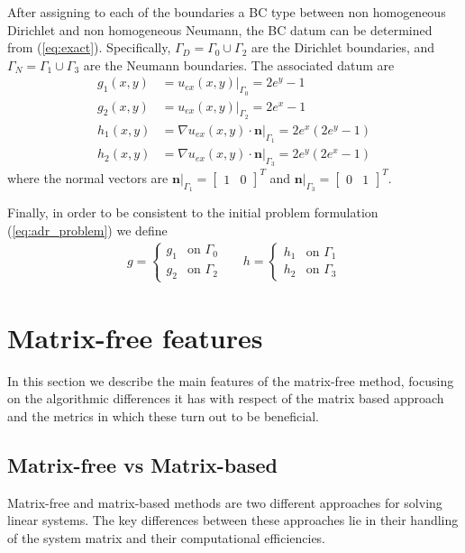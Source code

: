 \documentclass{article}
\begin{document}
After assigning to each of the boundaries a BC type between non homogeneous Dirichlet and non homogeneous Neumann, the BC datum can be determined from (\ref{eq:exact}). Specifically, $\Gamma_D = \Gamma_0 \cup \Gamma_2$ are the Dirichlet boundaries, and
 $\Gamma_N = \Gamma_1 \cup \Gamma_3$ are the Neumann boundaries. The associated datum are
\begin{align*}
    g_1(x,y)&= u_{ex}(x,y)\big|_{\Gamma_0} = 2e^y-1 \\
    g_2(x,y)&= u_{ex}(x,y)\big|_{\Gamma_2} = 2e^x-1 \\
    h_1(x,y)&= \nabla u_{ex}(x,y) \cdot \boldsymbol{n} \big|_{\Gamma_1} = 2e^x(2e^y-1) \\
    h_2(x,y)&= \nabla u_{ex}(x,y) \cdot \boldsymbol{n} \big|_{\Gamma_3} = 2e^y(2e^x-1)
\end{align*}
where the normal vectors are $ \boldsymbol{n}\big|_{\Gamma_1} = \begin{bmatrix}1&0\end{bmatrix}^T$ and $\boldsymbol{n} \big|_{\Gamma_3} = \begin{bmatrix}0&1\end{bmatrix}^T$.

Finally, in order to be consistent to the initial problem formulation (\ref{eq:adr_problem}) we define
\begin{align}
    g = \begin{cases}
        g_1 &\text{on } \Gamma_0 \\
        g_2 &\text{on } \Gamma_2
    \end{cases} & &
    h = \begin{cases}
        h_1 &\text{on } \Gamma_1 \\
        h_2 &\text{on } \Gamma_3
    \end{cases}
\end{align}

\section{Matrix-free features}
In this section we describe the main features of the matrix-free method, focusing on the algorithmic differences it has with respect of the matrix based approach and the metrics in which these turn out to be beneficial.

\subsection{Matrix-free vs Matrix-based}
Matrix-free and matrix-based methods are two different approaches for solving linear systems. The key differences between these approaches lie in their handling of the system matrix and their computational efficiencies.
\end{document}
